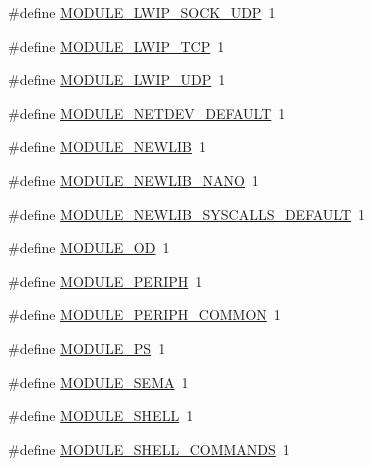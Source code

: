 \begin{DoxyCompactItemize}
\item 
\#define \hyperlink{openmote-cc2538_2riotbuild_2riotbuild_8h_a155bf15e30976ec34206987a90edf46f}{M\+O\+D\+U\+L\+E\+\_\+\+L\+W\+I\+P\+\_\+\+S\+O\+C\+K\+\_\+\+U\+DP}~1
\item 
\#define \hyperlink{openmote-cc2538_2riotbuild_2riotbuild_8h_a98ce3ed4af2c4be685f63a1ed678e20b}{M\+O\+D\+U\+L\+E\+\_\+\+L\+W\+I\+P\+\_\+\+T\+CP}~1
\item 
\#define \hyperlink{openmote-cc2538_2riotbuild_2riotbuild_8h_a77765da6c5da97ba0ef5e37c9d02764a}{M\+O\+D\+U\+L\+E\+\_\+\+L\+W\+I\+P\+\_\+\+U\+DP}~1
\item 
\#define \hyperlink{openmote-cc2538_2riotbuild_2riotbuild_8h_a849a25936e1a31d7d94b624117617d37}{M\+O\+D\+U\+L\+E\+\_\+\+N\+E\+T\+D\+E\+V\+\_\+\+D\+E\+F\+A\+U\+LT}~1
\item 
\#define \hyperlink{openmote-cc2538_2riotbuild_2riotbuild_8h_a9856104f98cb223f31ce261a19286529}{M\+O\+D\+U\+L\+E\+\_\+\+N\+E\+W\+L\+IB}~1
\item 
\#define \hyperlink{openmote-cc2538_2riotbuild_2riotbuild_8h_a888059fd44c078b0be1ccae9c89c3acd}{M\+O\+D\+U\+L\+E\+\_\+\+N\+E\+W\+L\+I\+B\+\_\+\+N\+A\+NO}~1
\item 
\#define \hyperlink{openmote-cc2538_2riotbuild_2riotbuild_8h_ae142d9f6cb6a84548b0df6d6ad7f85e7}{M\+O\+D\+U\+L\+E\+\_\+\+N\+E\+W\+L\+I\+B\+\_\+\+S\+Y\+S\+C\+A\+L\+L\+S\+\_\+\+D\+E\+F\+A\+U\+LT}~1
\item 
\#define \hyperlink{openmote-cc2538_2riotbuild_2riotbuild_8h_a267e17bd4cb62d1685de9e7f8b9b13de}{M\+O\+D\+U\+L\+E\+\_\+\+OD}~1
\item 
\#define \hyperlink{openmote-cc2538_2riotbuild_2riotbuild_8h_ab1580540c37a5d381a48a20a7aafe569}{M\+O\+D\+U\+L\+E\+\_\+\+P\+E\+R\+I\+PH}~1
\item 
\#define \hyperlink{openmote-cc2538_2riotbuild_2riotbuild_8h_ad6dbcb5e1bbad26f4becf95a25cee179}{M\+O\+D\+U\+L\+E\+\_\+\+P\+E\+R\+I\+P\+H\+\_\+\+C\+O\+M\+M\+ON}~1
\item 
\#define \hyperlink{openmote-cc2538_2riotbuild_2riotbuild_8h_aae869fb64b3d588fe2c5a085db7ed020}{M\+O\+D\+U\+L\+E\+\_\+\+PS}~1
\item 
\#define \hyperlink{openmote-cc2538_2riotbuild_2riotbuild_8h_a501927f59406aed16daf467d5f43d65b}{M\+O\+D\+U\+L\+E\+\_\+\+S\+E\+MA}~1
\item 
\#define \hyperlink{openmote-cc2538_2riotbuild_2riotbuild_8h_a0c17090e619649c6753bf730857668c5}{M\+O\+D\+U\+L\+E\+\_\+\+S\+H\+E\+LL}~1
\item 
\#define \hyperlink{openmote-cc2538_2riotbuild_2riotbuild_8h_a230d2ca9cea2aaf6533aee4e54f9868f}{M\+O\+D\+U\+L\+E\+\_\+\+S\+H\+E\+L\+L\+\_\+\+C\+O\+M\+M\+A\+N\+DS}~1

\end{DoxyCompactItemize}
